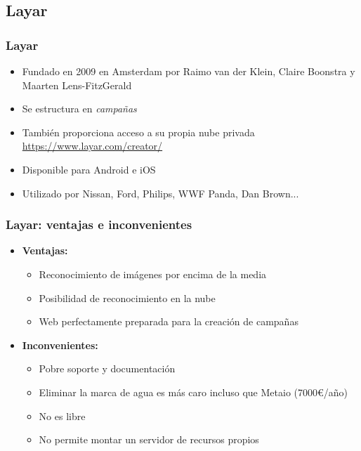 \subsection*{Layar}
\frame
{
\frametitle{Layar}
\begin{itemize}
 \item Fundado en 2009 en Amsterdam por Raimo van der Klein, Claire Boonstra y Maarten Lens-FitzGerald
 \item Se estructura en \textit{campañas}
 \item También proporciona acceso a su propia nube privada\\
   \url{https://www.layar.com/creator/}
 \item Disponible para Android e iOS
 \item Utilizado por Nissan, Ford, Philips, WWF Panda, Dan Brown...
\end{itemize}
}

\frame
{
\frametitle{Layar: ventajas e inconvenientes}
\begin{itemize}
\item \textbf{Ventajas:}
  \begin{itemize}
   \item Reconocimiento de imágenes por encima de la media
   \item Posibilidad de reconocimiento en la nube
   \item Web perfectamente preparada para la creación de campañas
  \end{itemize}

\item \textbf{Inconvenientes:}
  \begin{itemize}
   \item Pobre soporte y documentación
   \item Eliminar la marca de agua es más caro incluso que Metaio (7000\euro/año)
   \item No es libre
   \item No permite montar un servidor de recursos propios
  \end{itemize}

\end{itemize}
}

